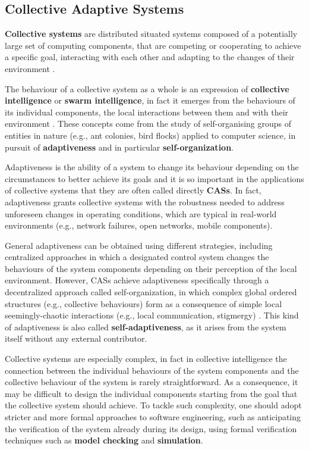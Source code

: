 
\subsection{Collective Adaptive Systems}
\label{section:background:concepts:cas}

\textbf{Collective systems} are distributed situated systems composed of a
potentially large set of computing components, that are competing or cooperating
to achieve a specific goal, interacting with each other and adapting to the
changes of their environment \cite{CAS}.

The behaviour of a collective system as a whole is an expression of
\textbf{collective intelligence} or \textbf{swarm intelligence}, in fact it
emerges from the behaviours of its individual components, the local
interactions between them and with their environment \cite{SwarmIntelligence}.
These concepts come from the study of self-organising groups of entities in
nature (e.g., ant colonies, bird flocks) applied to computer science, in
pursuit of \textbf{adaptiveness} and in particular \textbf{self-organization}.

Adaptiveness is the ability of a system to change its behaviour depending on
the circumstances to better achieve its goals and it is so important in the
applications of collective systems that they are often called directly
\textbf{\acp{CAS}}. In fact, adaptiveness grants collective systems with the
robustness needed to address unforeseen changes in operating conditions, which
are typical in real-world environments (e.g., network failures, open networks,
mobile components).

General adaptiveness can be obtained using different strategies, including
centralized approaches in which a designated control system changes the
behaviours of the system components depending on their perception of the local
environment. However, \acp{CAS} achieve adaptiveness specifically through a
decentralized approach called self-organization, in which complex global
ordered structures (e.g., collective behaviours) form as a consequence of
simple local seemingly-chaotic interactions (e.g., local communication,
stigmergy) \cite{SelfOrganization}. This kind of adaptiveness is also called
\textbf{self-adaptiveness}, as it arises from the system itself without any
external contributor.

Collective systems are especially complex, in fact in collective intelligence
the connection between the individual behaviours of the system components and
the collective behaviour of the system is rarely straightforward. As a
consequence, it may be difficult to design the individual components starting
from the goal that the collective system should achieve. To tackle such
complexity, one should adopt stricter and more formal approaches to software
engineering, such as anticipating the verification of the system already during
its design, using formal verification techniques such as \textbf{model
checking} and \textbf{simulation}.

